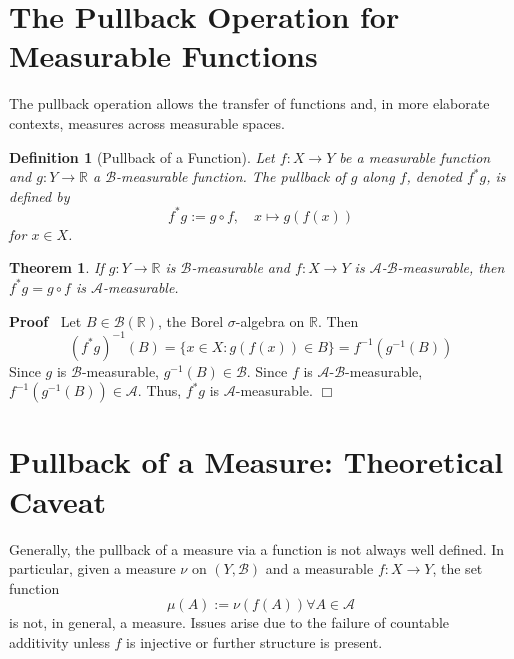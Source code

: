 \documentclass{article}
\newcommand{\assign}{:=}
\newcommand{\tmem}[1]{{\em #1\/}}
\newenvironment{proof}{\noindent\textbf{Proof\ }}{\hspace*{\fill}$\Box$\medskip}
\newtheorem{definition}{Definition}
\newtheorem{theorem}{Theorem}
\begin{document}
\section{The Pullback Operation for Measurable Functions}

The pullback operation allows the transfer of functions and, in more elaborate
contexts, measures across measurable spaces.

\begin{definition}
  [Pullback of a Function] Let $f : X \to Y$ be a measurable function and $g :
  Y \to \mathbb{R}$ a $\mathcal{B}$-measurable function. The {\tmem{pullback}}
  of $g$ along $f$, denoted $f^{\ast} g$, is defined by
  \begin{equation}
    f^{\ast} g \assign g \circ f, \quad x \mapsto g (f (x))
  \end{equation}
  for $x \in X$.
\end{definition}

\begin{theorem}
  If $g : Y \to \mathbb{R}$ is $\mathcal{B}$-measurable and $f : X \to Y$ is
  $\mathcal{A}$-$\mathcal{B}$-measurable, then $f^{\ast} g = g \circ f$ is
  $\mathcal{A}$-measurable.
\end{theorem}

\begin{proof}
  Let $B \in \mathcal{B} (\mathbb{R})$, the Borel $\sigma$-algebra on
  $\mathbb{R}$. Then
  \begin{equation}
    (f^{\ast} g)^{- 1} (B) = \{x \in X : g (f (x)) \in B\} = f^{- 1} (g^{- 1}
    (B))
  \end{equation}
  Since $g$ is $\mathcal{B}$-measurable, $g^{- 1} (B) \in \mathcal{B}$. Since
  $f$ is $\mathcal{A}$-$\mathcal{B}$-measurable, $f^{- 1} (g^{- 1} (B)) \in
  \mathcal{A}$. Thus, $f^{\ast} g$ is $\mathcal{A}$-measurable.
\end{proof}

\section{Pullback of a Measure: Theoretical Caveat}

Generally, the pullback of a measure via a function is not always well
defined. In particular, given a measure $\nu$ on $(Y, \mathcal{B})$ and a
measurable $f : X \to Y$, the set function
\begin{equation}
  \mu (A) \assign \nu (f (A)) \forall A \in \mathcal{A}
\end{equation}
is not, in general, a measure. Issues arise due to the failure of countable
additivity unless $f$ is injective or further structure is present.
\end{document}
